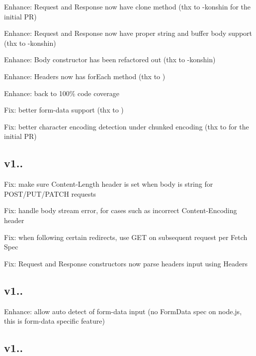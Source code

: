 \begin{DoxyItemize}
\item Enhance\+: Request and Response now have {\ttfamily clone} method (thx to -\/konshin for the initial PR)
\item Enhance\+: Request and Response now have proper string and buffer body support (thx to -\/konshin)
\item Enhance\+: Body constructor has been refactored out (thx to -\/konshin)
\item Enhance\+: Headers now has {\ttfamily for\+Each} method (thx to )
\item Enhance\+: back to 100\% code coverage
\item Fix\+: better form-\/data support (thx to )
\item Fix\+: better character encoding detection under chunked encoding (thx to  for the initial PR)
\end{DoxyItemize}

\subsection*{v1..}


\begin{DoxyItemize}
\item Fix\+: make sure {\ttfamily Content-\/\+Length} header is set when body is string for P\+O\+S\+T/\+P\+U\+T/\+P\+A\+T\+CH requests
\item Fix\+: handle body stream error, for cases such as incorrect {\ttfamily Content-\/\+Encoding} header
\item Fix\+: when following certain redirects, use {\ttfamily G\+ET} on subsequent request per Fetch Spec
\item Fix\+: {\ttfamily Request} and {\ttfamily Response} constructors now parse headers input using {\ttfamily Headers}
\end{DoxyItemize}

\subsection*{v1..}


\begin{DoxyItemize}
\item Enhance\+: allow auto detect of form-\/data input (no {\ttfamily Form\+Data} spec on node.\+js, this is form-\/data specific feature)
\end{DoxyItemize}

\subsection*{v1..}


